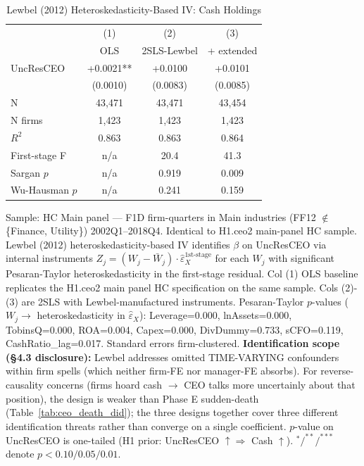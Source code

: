\begin{table}[!htbp]
\centering\footnotesize
\caption{Lewbel (2012) Heteroskedasticity-Based IV: Cash Holdings}
\label{tab:h_lewbel_iv}
\begin{tabular}{lccc}
\toprule
 & (1) & (2) & (3) \\
 & OLS & 2SLS-Lewbel & + extended \\
\midrule
UncResCEO & +0.0021** & +0.0100 & +0.0101 \\
 & (0.0010) & (0.0083) & (0.0085) \\
\midrule
N & 43,471 & 43,471 & 43,454 \\
N firms & 1,423 & 1,423 & 1,423 \\
$R^2$ & 0.863 & 0.863 & 0.864 \\
\midrule
First-stage F & n/a & 20.4 & 41.3 \\
Sargan $p$ & n/a & 0.919 & 0.009 \\
Wu-Hausman $p$ & n/a & 0.241 & 0.159 \\
\bottomrule
\end{tabular}
\begin{tablenotes}\footnotesize\item Sample: HC Main panel — F1D firm-quarters in Main industries (FF12 $\notin$ \{Finance, Utility\}) 2002Q1--2018Q4. Identical to H1.ceo2 main-panel HC sample. Lewbel (2012) heteroskedasticity-based IV identifies $\beta$ on UncResCEO via internal instruments $Z_j = (W_j - \bar W_j) \cdot \hat{\varepsilon}_X^{1\text{st-stage}}$ for each $W_j$ with significant Pesaran-Taylor heteroskedasticity in the first-stage residual. Col (1) OLS baseline replicates the H1.ceo2 main panel HC specification on the same sample. Cols (2)-(3) are 2SLS with Lewbel-manufactured instruments. Pesaran-Taylor $p$-values ($W_j \to$ heteroskedasticity in $\hat\varepsilon_X$): Leverage=0.000, lnAssets=0.000, TobinsQ=0.000, ROA=0.004, Capex=0.000, DivDummy=0.733, sCFO=0.119, CashRatio\_lag=0.017. Standard errors firm-clustered. \textbf{Identification scope (\S 4.3 disclosure):} Lewbel addresses omitted TIME-VARYING confounders within firm spells (which neither firm-FE nor manager-FE absorbs). For reverse-causality concerns (firms hoard cash $\to$ CEO talks more uncertainly about that position), the design is weaker than Phase E sudden-death (Table~\ref{tab:ceo_death_did}); the three designs together cover three different identification threats rather than converge on a single coefficient. $p$-value on UncResCEO is one-tailed (H1 prior: UncResCEO $\uparrow \Rightarrow$ Cash $\uparrow$). $^{*}/^{**}/^{***}$ denote $p<0.10/0.05/0.01$.\end{tablenotes}
\end{table}